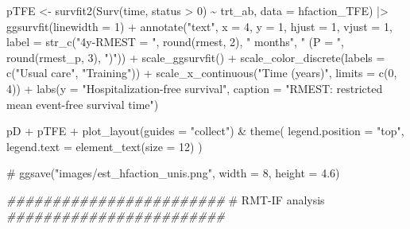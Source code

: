 \documentclass[
  letterpaper,
  DIV=11,
  numbers=noendperiod]{scrreprt}
\newenvironment{Shaded}{\begin{snugshade}}{\end{snugshade}}
\newcommand{\AttributeTok}[1]{\textcolor[rgb]{0.40,0.45,0.13}{#1}}
\newcommand{\CommentTok}[1]{\textcolor[rgb]{0.37,0.37,0.37}{#1}}
\newcommand{\DecValTok}[1]{\textcolor[rgb]{0.68,0.00,0.00}{#1}}
\newcommand{\DocumentationTok}[1]{\textcolor[rgb]{0.37,0.37,0.37}{\textit{#1}}}
\newcommand{\FunctionTok}[1]{\textcolor[rgb]{0.28,0.35,0.67}{#1}}
\newcommand{\NormalTok}[1]{\textcolor[rgb]{0.00,0.23,0.31}{#1}}
\newcommand{\OtherTok}[1]{\textcolor[rgb]{0.00,0.23,0.31}{#1}}
\newcommand{\SpecialCharTok}[1]{\textcolor[rgb]{0.37,0.37,0.37}{#1}}
\newcommand{\StringTok}[1]{\textcolor[rgb]{0.13,0.47,0.30}{#1}}
\begin{document}
\begin{Shaded}
\begin{Highlighting}[]
\NormalTok{pTFE }\OtherTok{\textless{}{-}} \FunctionTok{survfit2}\NormalTok{(}\FunctionTok{Surv}\NormalTok{(time, status }\SpecialCharTok{\textgreater{}} \DecValTok{0}\NormalTok{) }\SpecialCharTok{\textasciitilde{}}\NormalTok{ trt\_ab, }\AttributeTok{data =}\NormalTok{ hfaction\_TFE) }\SpecialCharTok{|\textgreater{}}
  \FunctionTok{ggsurvfit}\NormalTok{(}\AttributeTok{linewidth =} \DecValTok{1}\NormalTok{) }\SpecialCharTok{+}
  \FunctionTok{annotate}\NormalTok{(}\StringTok{"text"}\NormalTok{, }\AttributeTok{x =} \DecValTok{4}\NormalTok{, }\AttributeTok{y =} \DecValTok{1}\NormalTok{, }\AttributeTok{hjust =} \DecValTok{1}\NormalTok{, }\AttributeTok{vjust =} \DecValTok{1}\NormalTok{, }
           \AttributeTok{label =} \FunctionTok{str\_c}\NormalTok{(}\StringTok{"4y{-}RMEST = "}\NormalTok{, }\FunctionTok{round}\NormalTok{(rmest, }\DecValTok{2}\NormalTok{), }\StringTok{" months"}\NormalTok{,}
                         \StringTok{" (P = "}\NormalTok{, }\FunctionTok{round}\NormalTok{(rmest\_p, }\DecValTok{3}\NormalTok{), }\StringTok{")"}\NormalTok{)) }\SpecialCharTok{+}
  \FunctionTok{scale\_ggsurvfit}\NormalTok{() }\SpecialCharTok{+}
  \FunctionTok{scale\_color\_discrete}\NormalTok{(}\AttributeTok{labels =} \FunctionTok{c}\NormalTok{(}\StringTok{"Usual care"}\NormalTok{, }\StringTok{"Training"}\NormalTok{)) }\SpecialCharTok{+}
  \FunctionTok{scale\_x\_continuous}\NormalTok{(}\StringTok{"Time (years)"}\NormalTok{, }\AttributeTok{limits =} \FunctionTok{c}\NormalTok{(}\DecValTok{0}\NormalTok{, }\DecValTok{4}\NormalTok{)) }\SpecialCharTok{+}
  \FunctionTok{labs}\NormalTok{(}\AttributeTok{y =} \StringTok{"Hospitalization{-}free survival"}\NormalTok{,}
       \AttributeTok{caption =} \StringTok{"RMEST: restricted mean event{-}free survival time"}\NormalTok{)}


\NormalTok{pD }\SpecialCharTok{+}\NormalTok{ pTFE }\SpecialCharTok{+} \FunctionTok{plot\_layout}\NormalTok{(}\AttributeTok{guides =} \StringTok{"collect"}\NormalTok{) }\SpecialCharTok{\&} 
  \FunctionTok{theme}\NormalTok{(}
    \AttributeTok{legend.position =} \StringTok{"top"}\NormalTok{, }
    \AttributeTok{legend.text =} \FunctionTok{element\_text}\NormalTok{(}\AttributeTok{size =} \DecValTok{12}\NormalTok{)}
\NormalTok{  ) }

\CommentTok{\# ggsave("images/est\_hfaction\_unis.png", width = 8, height = 4.6)}


\DocumentationTok{\#\#\#\#\#\#\#\#\#\#\#\#\#\#\#\#\#\#\#\#\#\#\#\#}
\CommentTok{\# RMT{-}IF analysis}
\DocumentationTok{\#\#\#\#\#\#\#\#\#\#\#\#\#\#\#\#\#\#\#\#\#\#\#\#}



\end{Highlighting}
\end{Shaded}
\end{document}
